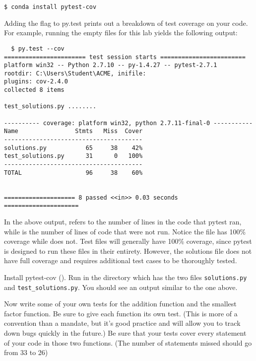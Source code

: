 \begin{lstlisting}
$ conda install pytest-cov
\end{lstlisting}

Adding the flag  to py.test prints out a breakdown of test coverage on your code. For example, running the empty files for this lab yields the following output:

\begin{lstlisting}
  $ py.test --cov
======================= test session starts ========================
platform win32 -- Python 2.7.10 -- py-1.4.27 -- pytest-2.7.1
rootdir: C:\Users\Student\ACME, inifile:
plugins: cov-2.4.0
collected 8 items

test_solutions.py ........

---------- coverage: platform win32, python 2.7.11-final-0 -----------
Name                Stmts   Miss  Cover
---------------------------------------
solutions.py           65     38    42%
test_solutions.py      31      0   100%
---------------------------------------
TOTAL                  96     38    60%


==================== 8 passed <<in>> 0.03 seconds =====================
\end{lstlisting}

In the above output,  refers to the number of lines in the code that pytest ran, while  is the number of lines of code that were not run.
Notice the file  has 100\% coverage while  does not. Test files will generally have 100\% coverage, since pytest is designed to run these files in their entirety. However, the solutions file does not have full coverage and requires additional test cases to be thoroughly tested.

\begin{problem}
Install pytest-cov ().
Run  in the directory which has the two files \texttt{solutions.py} and \texttt{test\_solutions.py}. You should see an output similar to the one above.

Now write some of your own tests for the addition function and the smallest factor function. Be sure to give each function its own test. (This is more of a convention than a mandate,
but it's good practice and will allow you to track down bugs quickly in the future.) Be sure that your tests cover every statement of your code in those two functions.
(The number of statements missed should go from 33 to 26)
\end{problem}

